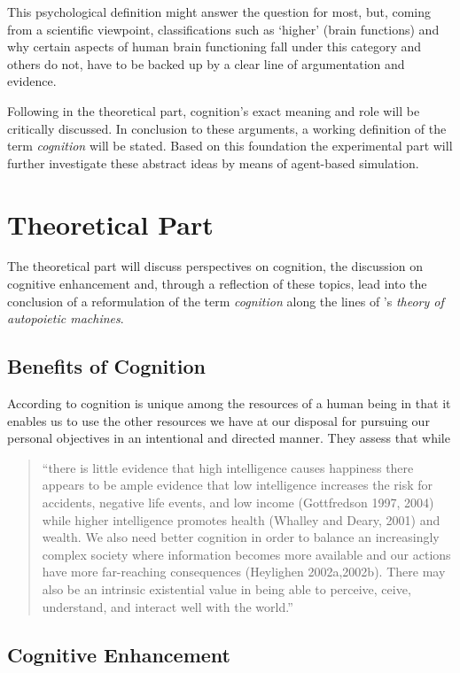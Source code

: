 This psychological definition might answer the question for most, but, coming from a scientific viewpoint, classifications such as `higher' (brain functions) and why certain aspects of human brain functioning fall under this category and others do not, have to be backed up by a clear line of argumentation and evidence. 

Following in the theoretical part, cognition's exact meaning and role will be critically discussed. In conclusion to these arguments, a working definition of the term \textit{cognition} will be stated. Based on this foundation the experimental part will further investigate these abstract ideas by means of agent-based simulation. 

\chapter{Theoretical Part}
The theoretical part will discuss perspectives on cognition, the discussion on cognitive enhancement and, through a reflection of these topics, lead into the conclusion of a reformulation of the term \emph{cognition} along the lines of \citeauthor{Maturana1980}’s \citeyearpar{Maturana1980} \emph{theory of autopoietic machines}.

\section{Benefits of Cognition}
According to \cite{Sandberg2006} cognition is unique among the resources of a human being in that it enables us to use the other resources we have at our disposal for pursuing our personal objectives in an intentional and directed manner. They assess that while \begin{quotation}``there is little evidence that high intelligence causes happiness there appears to be ample evidence that low intelligence increases the risk for accidents, negative life events, and low income (Gottfredson 1997, 2004) while higher intelligence promotes health (Whalley and Deary, 2001) and wealth. We also need better cognition in order to balance an increasingly complex society where information becomes more available and our actions have more far-reaching consequences (Heylighen 2002a,2002b). There may also be an intrinsic existential value in being able to perceive, ceive, understand, and interact well with the world.''\end{quotation}

\section{Cognitive Enhancement}
